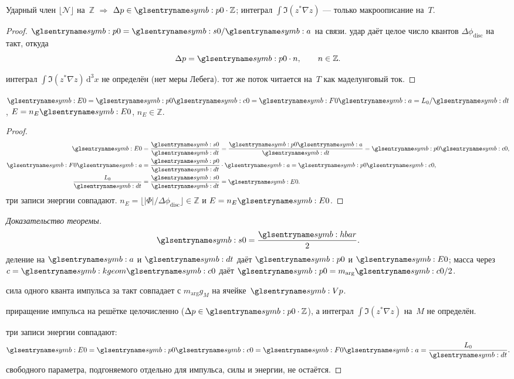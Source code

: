 \begin{lemma}[5.1d]
\label{lem:51d}
Ударный член $\lfloor\mathcal{N}\rfloor$ на~$\mathbb{Z}$ $\Rightarrow$ $\Delta p\in \ladderMomentum\cdot\mathbb{Z}$;
интеграл $\int\Im(z^*\nabla z)$ --- только макроописание на~$T$.
\end{lemma}

\begin{proof}
$\ladderMomentum=\ladderAction/\caStepSpace$ на связи.
удар даёт целое число квантов $\Delta\phi_{\mathrm{disc}}$ на такт, откуда
\[
  \Delta p=\ladderMomentum\cdot n,\qquad n\in\mathbb{Z}.
\]

\smallskip
{}
интеграл $\int\Im(z^*\nabla z)\,\mathrm{d}^3x$ не определён (нет меры Лебега).
тот же поток читается на~$T$ как маделунговый ток.
\end{proof}

\begin{lemma}[5.1e]
\label{lem:51e}
$\ladderEnergy=\ladderMomentum \caSignalSpeed=\ladderForce\caStepSpace=L_0/\htick$, $E=n_E \ladderEnergy$, $n_E\in\mathbb{Z}$.
\end{lemma}

\begin{proof}
\begin{align*}
  \ladderEnergy&=\frac{\ladderAction}{\htick}=\frac{\ladderMomentum\caStepSpace}{\htick}=\ladderMomentum \caSignalSpeed,\\
  \ladderForce\caStepSpace&=\frac{\ladderMomentum}{\htick}\cdot\caStepSpace=\ladderMomentum \caSignalSpeed,\\
  \frac{L_0}{\htick}&=\frac{\ladderAction}{\htick}=\ladderEnergy.
\end{align*}
\pfollows
три записи энергии совпадают.
$n_E=\lfloor|\Phi|/\Delta\phi_{\mathrm{disc}}\rfloor\in\mathbb{Z}$ и $E=n_E \ladderEnergy$.
\end{proof}

\begin{proof}[Доказательство теоремы]
\[
  \ladderAction=\frac{\planckHbar}{2}.
\]
деление на $\caStepSpace$ и $\htick$ даёт $\ladderMomentum$ и $\ladderEnergy$;
масса через $c=\kgeom \caSignalSpeed$ даёт $\ladderMomentum=m_{\arg} \caSignalSpeed/2$.

сила одного кванта импульса за такт совпадает с $m_{\arg} g_M$ на ячейке~$\hv$.

приращение импульса на решётке целочисленно ($\Delta p\in\ladderMomentum\cdot\mathbb{Z}$),
а интеграл $\int\Im(z^*\nabla z)$ на~$M$ не определён.

три записи энергии совпадают:
\[
  \ladderEnergy=\ladderMomentum \caSignalSpeed=\ladderForce\caStepSpace=\frac{L_0}{\htick}.
\]
\phence свободного параметра, подгоняемого отдельно для импульса, силы и энергии, не остаётся.
\end{proof}

